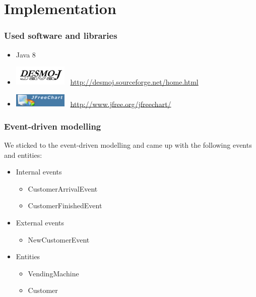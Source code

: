 \documentclass{beamer}
\begin{document}
\section{Implementation}
\begin{frame}
\frametitle{Used software and libraries}
\begin{itemize}
\item Java 8
\item \includegraphics[width=0.2\textwidth]{images/desmoj.png} \ \url{http://desmoj.sourceforge.net/home.html}
\item \includegraphics[width=0.2\textwidth]{images/jfreechart.png} \ \url{http://www.jfree.org/jfreechart/}
\end{itemize}
\end{frame}

\begin{frame}
\frametitle{Event-driven modelling}
We sticked to the event-driven modelling and came up with the following events and entities:
\begin{itemize}
\item Internal events 
\begin{itemize}
\item CustomerArrivalEvent
\item CustomerFinishedEvent
\end{itemize}
\item External events
\begin{itemize}
\item NewCustomerEvent
\end{itemize}
\item Entities
\begin{itemize}
\item VendingMachine
\item Customer
\end{itemize}
\end{itemize}
\end{frame}
\end{document}
